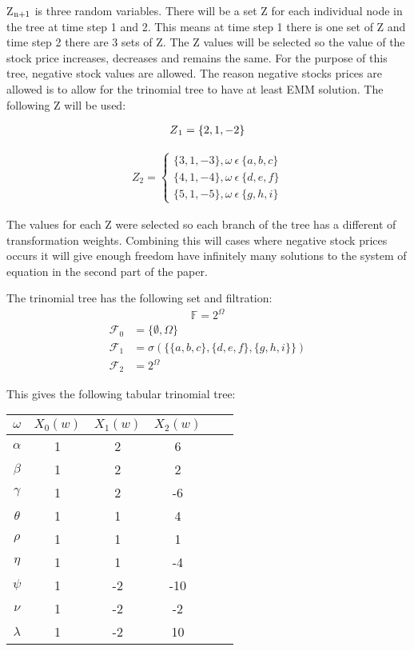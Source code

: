 \documentclass{article}
\begin{document}
Z$\textsubscript{n+1}$ is three random variables. There will be a set Z for each individual node in the tree at time step 1 and 2. This means at time step 1 there is one set of Z and time step 2 there are 3 sets of Z. The Z values will be selected so the value of the stock price increases, decreases and remains the same. For the purpose of this tree, negative stock values are allowed. The reason negative stocks prices are allowed is to allow for the trinomial tree to have at least EMM solution. The following Z will be used:

\begin{align*}
 Z\textsubscript{1}= \{ 2, 1, -2 \}
\end{align*}

\begin{align*}
    Z_2 = \begin{cases}
        \{ 3, 1, -3\}, \omega \medspace \epsilon \medspace \{ a, b, c \} \\
        \{ 4, 1, -4\}, \omega \medspace \epsilon \medspace \{ d, e, f \} \\
        \{ 5, 1, -5\}, \omega \medspace \epsilon \medspace \{ g, h, i \}
    \end{cases}
\end{align*}

The values for each Z were selected so each branch of the tree has a different of transformation weights. Combining this will cases where negative stock prices occurs it will give enough freedom have infinitely many solutions to the system of equation in the second part of the paper.

The trinomial tree has the following set and filtration:
\begin{align*}
    \mathbb{F} = 2^\Omega
\end{align*}
\begin{align*}
    \mathcal{F}_0 &= \{\emptyset,\Omega\} \\
    \mathcal{F}_1 &= \sigma(\{\{a,b,c\},\{d,e,f\},\{g,h,i\}\}) \\
    \mathcal{F}_2 &= 2^\Omega
\end{align*}

This gives the following tabular trinomial tree:

\begin{center}
\begin{tabular}{|c|c|c|c|c|c|}
\hline
$\omega$ & $X_0(w)$ & $X_1(w)$ & $X_2(w)$ \\
\hline
\hline
$\alpha$ & 1 & 2 & 6 \\\hline
$\beta$ & 1 & 2 & 2 \\\hline
$\gamma$ & 1 & 2 & -6 \\\hline
$\theta$ & 1 & 1 & 4 \\\hline
$\rho$ & 1 & 1 & 1 \\\hline
$\eta$ & 1 & 1 & -4 \\\hline
$\psi$ & 1 & -2 & -10 \\\hline
$\nu$ & 1 & -2 & -2 \\\hline
$\lambda$ & 1 & -2 & 10 \\\hline
\end{tabular}
\end{center}
\end{document}
